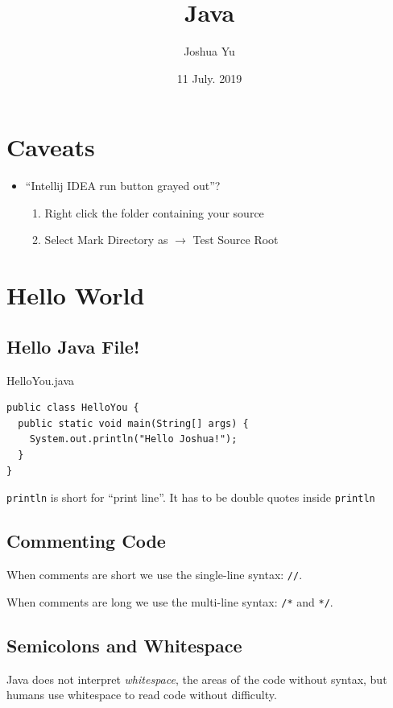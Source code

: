 \documentclass[a4paper, 12pt]{article}
\begin{document}

\large
\title{Java}
\author{Joshua Yu}
\date{11 July. 2019}
\maketitle
\tableofcontents


\section{Caveats}
\begin{itemize}
\item ``Intellij IDEA run button grayed out''?
\begin{enumerate}
\item Right click the folder containing your source
\item Select Mark Directory as $\rightarrow$ Test Source Root
\end{enumerate}


\end{itemize}


\section{Hello World}
\subsection{Hello Java File!}
HelloYou.java

\begin{verbatim}
public class HelloYou {
  public static void main(String[] args) {
    System.out.println("Hello Joshua!");
  }
}
\end{verbatim}
\verb|println| is short for ``print line''. It has to be double quotes inside \verb|println|

\subsection{Commenting Code}
When comments are short we use the single-line syntax: \verb|//|.

When comments are long we use the multi-line syntax: \verb|/*| and \verb|*/|.

\subsection{Semicolons and Whitespace}
Java does not interpret \textit{whitespace}, the areas of the code without syntax, but humans use whitespace to read code without difficulty.
\end{document}
